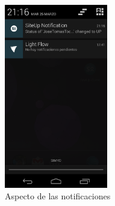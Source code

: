 \begin{figure}[hbtp]
  \centering
  \includegraphics[width=0.4\textwidth]{5_diseno/android-5}
  \caption{Aspecto de las notificaciones}
  \label{fig:manual-android-notification}
\end{figure}



